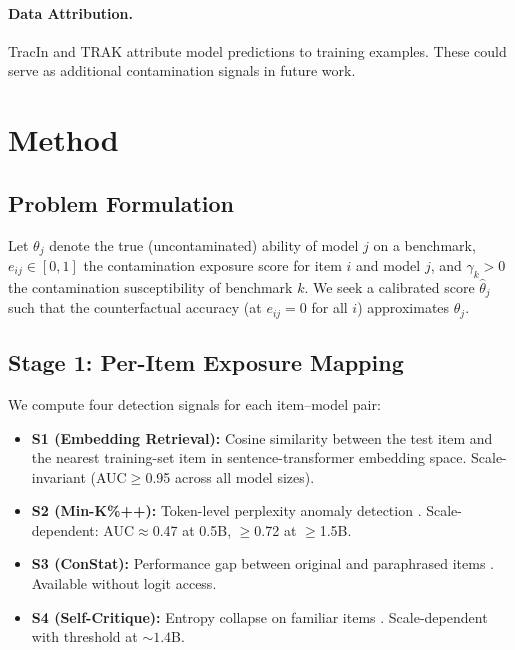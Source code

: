 \documentclass[11pt,a4paper]{article}
\begin{document}
\paragraph{Data Attribution.}
TracIn \citep{pruthi2020estimating} and TRAK \citep{park2023trak} attribute model predictions to training examples.
These could serve as additional contamination signals in future work.


\section{Method}

\subsection{Problem Formulation}

Let $\theta_j$ denote the true (uncontaminated) ability of model $j$ on a benchmark, $e_{ij}\in[0,1]$ the contamination exposure score for item $i$ and model $j$, and $\gamma_k > 0$ the contamination susceptibility of benchmark $k$.
We seek a calibrated score $\hat{\theta}_j$ such that the counterfactual accuracy (at $e_{ij}=0$ for all $i$) approximates $\theta_j$.

\subsection{Stage 1: Per-Item Exposure Mapping}

We compute four detection signals for each item--model pair:
\begin{itemize}
\item \textbf{S1 (Embedding Retrieval):} Cosine similarity between the test item and the nearest training-set item in sentence-transformer embedding space. Scale-invariant (AUC$\geq$0.95 across all model sizes).
\item \textbf{S2 (Min-K\%++):} Token-level perplexity anomaly detection \citep{shi2024detecting}. Scale-dependent: AUC$\approx$0.47 at 0.5B, $\geq$0.72 at $\geq$1.5B.
\item \textbf{S3 (ConStat):} Performance gap between original and paraphrased items \citep{dekoninck2024constat}. Available without logit access.
\item \textbf{S4 (Self-Critique):} Entropy collapse on familiar items \citep{weller2024selfcritique}. Scale-dependent with threshold at ${\sim}1.4$B.
\end{itemize}
\end{document}
